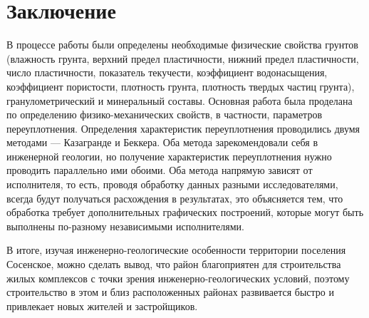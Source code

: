\chapter*{Заключение}                       %

%
%
%
%

В процессе работы были определены необходимые физические свойства
грунтов (влажность грунта, верхний предел пластичности, 
нижний предел пластичности, число пластичности, 
показатель текучести, коэффициент водонасыщения, 
коэффициент пористости, плотность грунта, 
плотность твердых частиц грунта), гранулометрический и 
минеральный составы. Основная работа была проделана по 
определению физико-механических свойств, 
в частности, параметров переуплотнения. Определения 
характеристик переуплотнения проводились 
двумя методами --- Казагранде и Беккера. 
Оба метода зарекомендовали себя в инженерной 
геологии, но получение характеристик переуплотнения 
нужно проводить параллельно ими обоими. Оба метода 
напрямую зависят от исполнителя, то есть, проводя 
обработку данных разными исследователями, всегда 
будут получаться расхождения в результатах, это 
объясняется тем, что обработка требует дополнительных 
графических построений, которые могут быть 
выполнены по-разному независимыми исполнителями.

В итоге, изучая инженерно-геологические особенности территории поселения Сосенское, 
можно сделать вывод, что район благоприятен для строительства жилых комплексов 
с точки зрения инженерно-геологических условий, поэтому строительство в этом и близ 
расположенных районах развивается быстро и привлекает новых жителей и застройщиков.